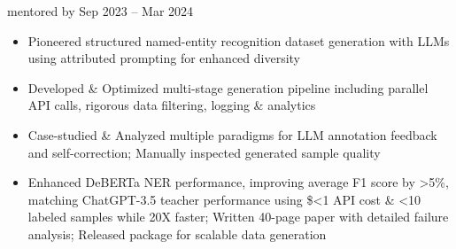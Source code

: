     {{\bodyfontsize \color{body} mentored by} }
    {Sep 2023 -- Mar 2024}{}{}
\begin{itemize}

    \item Pioneered structured named-entity recognition dataset generation with LLMs using attributed prompting for enhanced diversity

    \item Developed \& Optimized multi-stage generation pipeline including parallel API calls, rigorous data filtering, logging \& analytics

    \item Case-studied \& Analyzed multiple paradigms for LLM annotation feedback and self-correction; Manually inspected generated sample quality

    \item Enhanced DeBERTa NER performance, improving average F1 score by >5\%, matching ChatGPT-3.5 teacher performance
    using \$<1 API cost \& <10 labeled samples while 20X faster; Written 40-page paper with detailed failure analysis; Released package for scalable data generation
\end{itemize}
\dividerSmall


